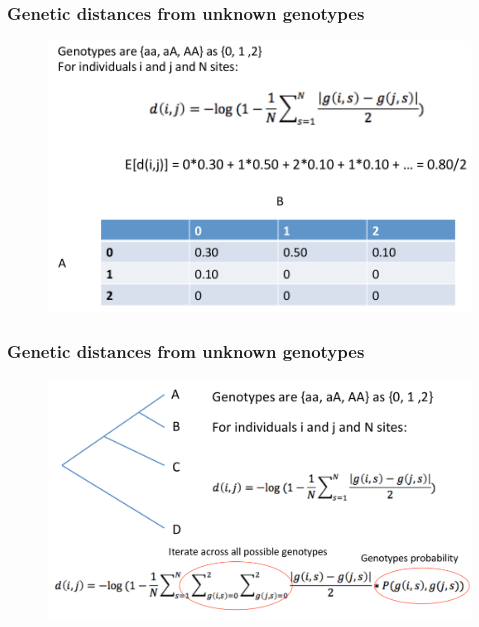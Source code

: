 
\begin{frame}
\frametitle{Genetic distances from \textbf{unknown} genotypes}

        \begin{figure}
                \includegraphics[width=\textwidth]{Pics/gdist_4.png}
        \end{figure}

\end{frame}


\begin{frame}
\frametitle{Genetic distances from \textbf{unknown} genotypes}

        \begin{figure}
                \includegraphics[width=\textwidth]{Pics/gdist_5.png}
        \end{figure}

\end{frame}


